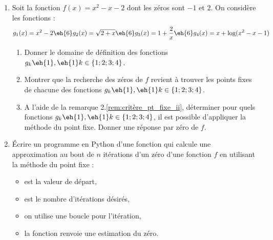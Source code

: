 \begin{boxexstheorieligne}

\begin{enumerate}[label=\textbf{E\thechapter.\arabic*},itemsep=8mm,resume=refexercices]

\item Soit la fonction $f(x)=x^2-x-2$ dont les zéros sont $-1$ et $2$. On considère les fonctions :
$$g_1(x)=x^2-2\eh{6} g_2(x)=\sqrt{2+x}\eh{6}g_3(x)=1+\frac{2}{x} \eh{6}g_4(x)=x+\log(x^2-x-1)$$
\begin{enumerate}[label=\roman*)]
\item Donner le domaine de définition des fonctions $g_k\eh{1}, \eh{1}k\in\{1;2;3;4\}$.
\item Montrer que la recherche des zéros de $f$ revient à trouver les points fixes de chacune des fonctions $g_k\eh{1}, \eh{1}k\in\{1;2;3;4\}$.
\item A l'aide de la remarque 2.\ref*{rem:critère_pt_fixe_ii}, déterminer pour quels fonctions $g_k\eh{1}, \eh{1}k\in\{1;2;3;4\}$, il est possible d'appliquer la méthode du point fixe. Donner une réponse par zéro de $f$.
\end{enumerate}




\item Écrire un programme en Python d'une fonction  qui calcule une approximation au bout de $n$ itérations d'un zéro d'une fonction $f$ en utilisant la méthode du point fixe : 
\vspace{-5mm}
\begin{itemize}[left=0mm, itemsep=1mm]
\item {} est la valeur de départ,
\item {} est le nombre d'itérations désirés,
\item on utilise une boucle  pour l'itération,
\item la fonction renvoie une estimation du zéro.
\end{itemize}







\end{enumerate}
\end{boxexstheorieligne}
